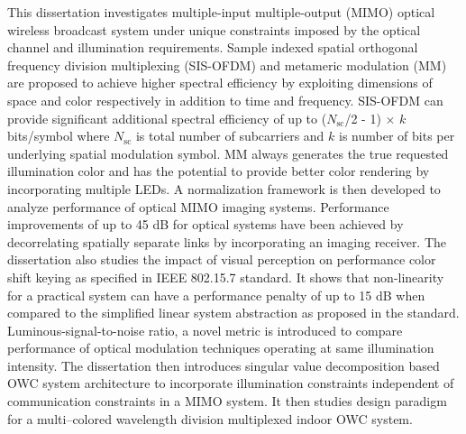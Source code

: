 This dissertation investigates multiple-input multiple-output (MIMO) optical wireless broadcast system under unique constraints imposed by the optical channel and illumination requirements. Sample indexed spatial orthogonal frequency division multiplexing (SIS-OFDM) and metameric modulation (MM) are proposed to achieve higher spectral efficiency by exploiting dimensions of space and color respectively in addition to time and frequency. SIS-OFDM can provide significant additional spectral efficiency of up to ($N_{\text{sc}}$/2 - 1) $\times$ $k$ bits/symbol where $N_{\text{sc}}$ is total number of subcarriers and $k$ is number of bits per underlying spatial modulation symbol. MM always generates the true requested illumination color and has the potential to provide better color rendering by incorporating multiple LEDs. A normalization framework is then developed to analyze performance of optical MIMO imaging systems. Performance improvements of up to 45 dB for optical systems have been achieved by decorrelating spatially separate links by incorporating an imaging receiver. The dissertation also studies the impact of visual perception on performance color shift keying as specified in IEEE 802.15.7 standard. It shows that non-linearity for a practical system can have a performance penalty of up to 15 dB when compared to the simplified linear system abstraction as proposed in the standard. Luminous-signal-to-noise ratio, a novel metric is introduced to compare performance of optical modulation techniques operating at same illumination intensity. The dissertation then introduces singular value decomposition based OWC system architecture to incorporate illumination constraints independent of communication constraints in a MIMO system. It then studies design paradigm for a multi--colored wavelength division multiplexed indoor OWC system.
